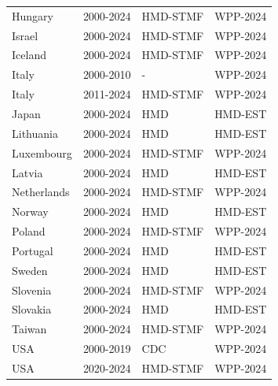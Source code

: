 \begin{table}[t]
\begin{tabular*}{\linewidth}{@{\extracolsep{\fill}}lrll}
Hungary & 2000-2024 & HMD-STMF & WPP-2024 \\ 
Israel & 2000-2024 & HMD-STMF & WPP-2024 \\ 
Iceland & 2000-2024 & HMD-STMF & WPP-2024 \\ 
Italy & 2000-2010 & - & WPP-2024 \\ 
Italy & 2011-2024 & HMD-STMF & WPP-2024 \\ 
Japan & 2000-2024 & HMD & HMD-EST \\ 
Lithuania & 2000-2024 & HMD & HMD-EST \\ 
Luxembourg & 2000-2024 & HMD-STMF & WPP-2024 \\ 
Latvia & 2000-2024 & HMD & HMD-EST \\ 
Netherlands & 2000-2024 & HMD-STMF & WPP-2024 \\ 
Norway & 2000-2024 & HMD & HMD-EST \\ 
Poland & 2000-2024 & HMD-STMF & WPP-2024 \\ 
Portugal & 2000-2024 & HMD & HMD-EST \\ 
Sweden & 2000-2024 & HMD & HMD-EST \\ 
Slovenia & 2000-2024 & HMD-STMF & WPP-2024 \\ 
Slovakia & 2000-2024 & HMD & HMD-EST \\ 
Taiwan & 2000-2024 & HMD-STMF & WPP-2024 \\ 
USA & 2000-2019 & CDC & WPP-2024 \\ 
USA & 2020-2024 & HMD-STMF & WPP-2024 \\ 
\bottomrule
\end{tabular*}
\end{table}

